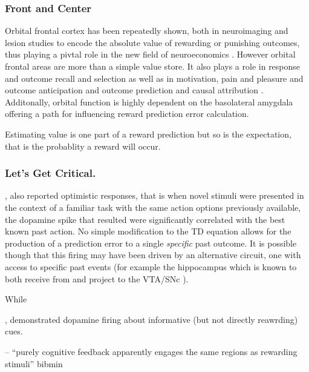 \documentclass[doc,12pt]{apa}        %
\begin{document}
\subsubsection{Front and Center}
\label{sub:f_and_c}
Orbital frontal cortex has been repeatedly shown, both in neuroimaging \cite{ODoherty:2001p2423} and lesion \cite{Hornak:2004p6234} studies to encode the absolute value of rewarding or punishing outcomes, thus playing a pivtal role in the new field of neuroeconomics \cite{Glimcher:2005p863}. However orbital frontal areas are more than a simple value store.  It also plays a role in response and outcome recall \cite{Furuyashiki:2008p1631} and selection \cite{Rudebeck:2008p4712} as well as in motivation, pain and pleasure \cite{Atlas:2010p7566} and outcome anticipation \cite{Roesch:2007p7182} and outcome prediction \cite{Tanaka:2006fk} and causal attribution \cite{Tanaka:2008p3265}.  Additonally, orbital function is highly dependent on the basolateral amygdala \cite{ODoherty:2003p2616} offering a path for influencing reward prediction error calculation.

Estimating value is one part of a reward prediction but so is the expectation, that is the probablity a reward will occur.  

\subsubsection{Let's Get Critical.}
\label{sub:in_the_str}




, also reported optimistic responses, that is when novel stimuli were presented in the context of a familiar task with the same action options previously available, the dopamine spike that resulted were significantly correlated with the best known past action.  No simple modification to the TD equation allows for the production of a prediction error to a single \emph{specific} past outcome.  It is possible though that this firing may have been driven by an alternative circuit, one with access to specific past events (for example the hippocampus which is known to both receive from and project to the VTA/SNc \cite{Lisman:2005p5455}). 

While \item {}, demonstrated dopamine firing about informative (but not directly reawrding) cues. 

\cite{Aron:2004p5459} -- ``purely cognitive feedback apparently engages the same regions as rewarding stimuli''
\newpage
 {bibmin}
\end{document}
